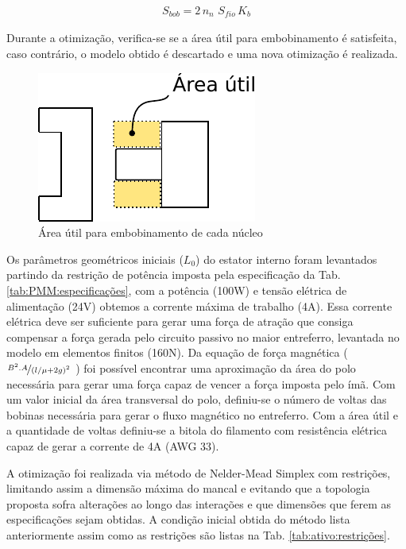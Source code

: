 \begin{align}
	S_{bob} = 2 \, n_n \, \, S_{fio} \, K_b
\end{align}

Durante a otimização, verifica-se se a área útil para embobinamento é satisfeita, caso contrário, o modelo obtido é descartado e uma nova otimização é realizada.

\begin{figure}[ht!]
\centering
\includegraphics[width=0.7\linewidth]{Figs/modelo_ativo_bobina}
\caption{Área útil para embobinamento de cada núcleo}
\label{fig:modelo_ativo_bobina}
\end{figure}

Os parâmetros geométricos iniciais ($L_0$) do estator interno foram levantados partindo da restrição de potência imposta pela especificação da Tab. \ref{tab:PMM:especificações}, com a potência (100W) e  tensão elétrica de alimentação (24V) obtemos a corrente máxima de trabalho (4A). Essa corrente elétrica deve ser suficiente para gerar uma força de atração que consiga compensar a força gerada pelo circuito passivo no maior entreferro, levantada no modelo em elementos finitos (160N). Da equação de força magnética ($\nicefrac{B^2.A}{(l/\mu +2g)^2}$ ) foi possível encontrar uma aproximação da área do polo necessária para gerar uma força capaz de vencer a força imposta pelo ímã. Com um valor inicial da área transversal do polo, definiu-se o número de voltas das bobinas necessária para gerar o fluxo magnético no entreferro. Com a área útil e a quantidade de voltas definiu-se a bitola do filamento com resistência elétrica capaz de gerar a corrente de 4A (AWG 33).

A otimização foi realizada via método de Nelder-Mead Simplex com restrições, limitando assim a dimensão máxima do mancal e evitando que a topologia proposta sofra alterações ao longo das interações e que dimensões que ferem as especificações sejam obtidas. A condição inicial obtida do método lista anteriormente assim como as restrições são listas na Tab. \ref{tab:ativo:restrições}.

